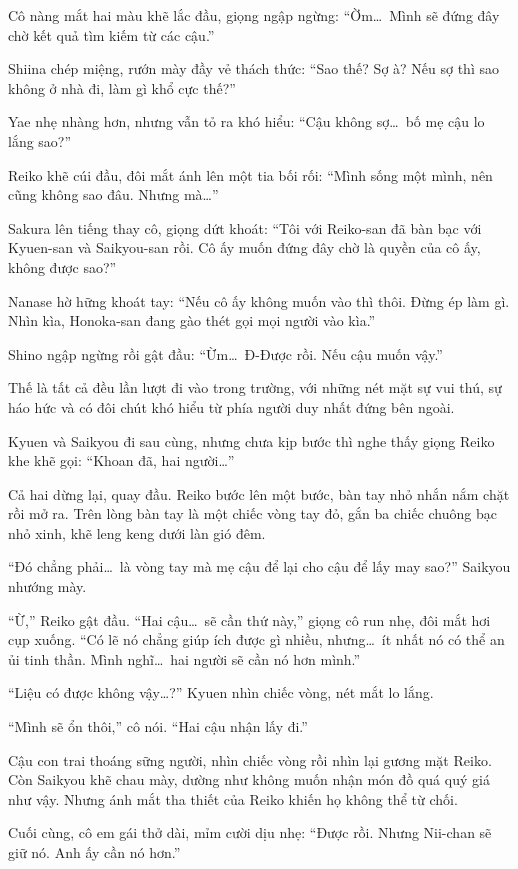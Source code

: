 \documentclass[../main.tex]{subfiles}
\begin{document}
Cô nàng mắt hai màu khẽ lắc đầu, giọng ngập ngừng: ``Ờm\dots\ Mình sẽ đứng đây chờ kết quả tìm kiếm từ các cậu.''

Shiina chép miệng, rướn mày đầy vẻ thách thức: ``Sao thế? Sợ à? Nếu sợ thì sao không ở nhà đi, làm gì khổ cực thế?''

Yae nhẹ nhàng hơn, nhưng vẫn tỏ ra khó hiểu: ``Cậu không sợ\dots\ bố mẹ cậu lo lắng sao?''

Reiko khẽ cúi đầu, đôi mắt ánh lên một tia bối rối: ``Mình sống một mình, nên cũng không sao đâu. Nhưng mà\dots''

Sakura lên tiếng thay cô, giọng dứt khoát: ``Tôi với Reiko-san đã bàn bạc với Kyuen-san và Saikyou-san rồi. Cô ấy muốn đứng đây chờ là quyền của cô ấy, không được sao?''

Nanase hờ hững khoát tay: ``Nếu cô ấy không muốn vào thì thôi. Đừng ép làm gì. Nhìn kìa, Honoka-san đang gào thét gọi mọi người vào kìa.''

Shino ngập ngừng rồi gật đầu: ``Ừm\dots\ Đ-Được rồi. Nếu cậu muốn vậy.''

Thế là tất cả đều lần lượt đi vào trong trường, với những nét mặt sự vui thú, sự háo hức và có đôi chút khó hiểu từ phía người duy nhất đứng bên ngoài.

Kyuen và Saikyou đi sau cùng, nhưng chưa kịp bước thì nghe thấy giọng Reiko khe khẽ gọi: ``Khoan đã, hai người\dots''

Cả hai dừng lại, quay đầu. Reiko bước lên một bước, bàn tay nhỏ nhắn nắm chặt rồi mở ra. Trên lòng bàn tay là một chiếc vòng tay đỏ, gắn ba chiếc chuông bạc nhỏ xinh, khẽ leng keng dưới làn gió đêm.

``Đó chẳng phải\dots\ là vòng tay mà mẹ cậu để lại cho cậu để lấy may sao?'' Saikyou nhướng mày.

``Ừ,'' Reiko gật đầu. ``Hai cậu\dots\ sẽ cần thứ này,'' giọng cô run nhẹ, đôi mắt hơi cụp xuống. ``Có lẽ nó chẳng giúp ích được gì nhiều, nhưng\dots\ ít nhất nó có thể an ủi tinh thần. Mình nghĩ\dots\ hai người sẽ cần nó hơn mình.''

``Liệu có được không vậy\dots?'' Kyuen nhìn chiếc vòng, nét mắt lo lắng.

``Mình sẽ ổn thôi,'' cô nói. ``Hai cậu nhận lấy đi.''

Cậu con trai thoáng sững người, nhìn chiếc vòng rồi nhìn lại gương mặt Reiko. Còn Saikyou khẽ chau mày, dường như không muốn nhận món đồ quá quý giá như vậy. Nhưng ánh mắt tha thiết của Reiko khiến họ không thể từ chối.

Cuối cùng, cô em gái thở dài, mỉm cười dịu nhẹ: ``Được rồi. Nhưng Nii-chan sẽ giữ nó. Anh ấy cần nó hơn.''
\end{document}
